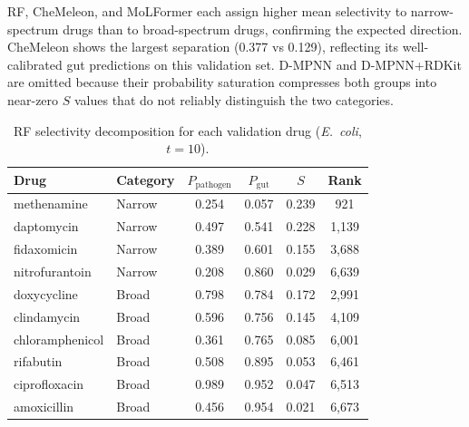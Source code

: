 \documentclass{article}
\newcommand{\pp}{P_{\mathrm{pathogen}}}
\newcommand{\pg}{P_{\mathrm{gut}}}
\begin{document}
\begin{table}[ht]
\caption{Known drug validation: mean selectivity score $S$ for clinically narrow-spectrum drugs (daptomycin, fidaxomicin, methenamine, nitrofurantoin) vs broad-spectrum drugs (amoxicillin, ciprofloxacin, chloramphenicol, clindamycin, doxycycline, rifabutin). All three reported models assign higher mean $S$ to narrow-spectrum drugs, confirming the selectivity framework operates in the expected direction.}
\label{tab:known_drug}
\centering
\scriptsize
{}
\end{table}

RF, CheMeleon, and MoLFormer each assign higher mean selectivity to narrow-spectrum drugs than to broad-spectrum drugs, confirming the expected direction.
CheMeleon shows the largest separation (0.377 vs 0.129), reflecting its well-calibrated gut predictions on this validation set.
D-MPNN and D-MPNN+RDKit are omitted because their probability saturation compresses both groups into near-zero $S$ values that do not reliably distinguish the two categories.

\begin{table}[ht]
\caption{RF selectivity decomposition for each validation drug (\textit{E.~coli}, $t{=}10$).}
\label{tab:validation_detail}
\centering
\scriptsize
\begin{tabular}{llcccc}
\toprule
\textbf{Drug} & \textbf{Category} & $\pp$ & $\pg$ & $S$ & \textbf{Rank} \\
\midrule
methenamine    & Narrow & 0.254 & 0.057 & 0.239 & 921 \\
daptomycin     & Narrow & 0.497 & 0.541 & 0.228 & 1,139 \\
fidaxomicin    & Narrow & 0.389 & 0.601 & 0.155 & 3,688 \\
nitrofurantoin & Narrow & 0.208 & 0.860 & 0.029 & 6,639 \\
\midrule
doxycycline    & Broad  & 0.798 & 0.784 & 0.172 & 2,991 \\
clindamycin    & Broad  & 0.596 & 0.756 & 0.145 & 4,109 \\
chloramphenicol& Broad  & 0.361 & 0.765 & 0.085 & 6,001 \\
rifabutin      & Broad  & 0.508 & 0.895 & 0.053 & 6,461 \\
ciprofloxacin  & Broad  & 0.989 & 0.952 & 0.047 & 6,513 \\
amoxicillin    & Broad  & 0.456 & 0.954 & 0.021 & 6,673 \\
\bottomrule
\end{tabular}
\end{table}
\end{document}
